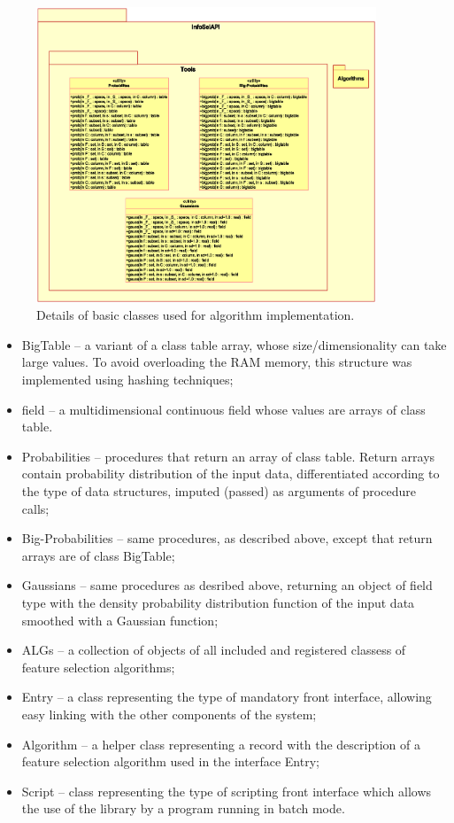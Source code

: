 \documentclass[a4paper,fleqn]{report}
\begin{document}
\begin{figure}[!b] \label{pic:lib-toolsb}
  \begin{center}
    \includegraphics[width=4in]{./figs/Lib-toolsB.eps}
  \end{center}
  \caption{\small Details of basic classes used for algorithm implementation.}
\end{figure}


\begin{itemize}
\item BigTable -- a variant of a class table array, whose size/dimensionality can take large values. To avoid overloading the RAM memory, this structure was implemented using hashing techniques;
\item field -- a multidimensional continuous field whose values are arrays of class table.
\item Probabilities -- procedures that return an array of class table. Return arrays contain probability distribution of the input data, differentiated according to the type of data structures, imputed (passed) as arguments of procedure calls;
\item Big-Probabilities -- same procedures, as described above, except that return arrays are of class BigTable;
\item Gaussians -- same procedures as desribed above, returning an object of field type with the density probability distribution function of the input data smoothed with a Gaussian function;
\item ALGs -- a collection of objects of all included and registered classess of feature selection algorithms;
\item Entry -- a class representing the type of mandatory front interface, allowing easy linking with the other components of the system;
\item Algorithm -- a helper class representing a record with the description of a feature selection algorithm used in the interface Entry;
\item Script -- class representing the type of scripting front interface which allows the use of the library by a program running in batch mode.
\end{itemize}
\end{document}
